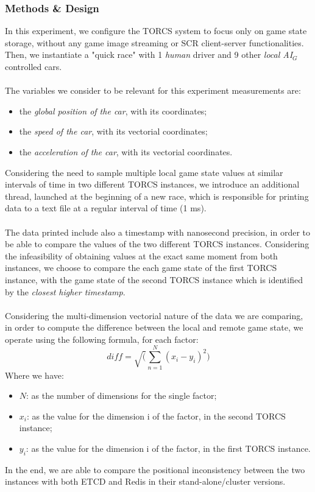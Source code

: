 \subsubsection{Methods \& Design}
In this experiment, we configure the TORCS system to focus only on game state storage, without any game image streaming or SCR client-server functionalities. Then, we instantiate a "quick race" with 1 \textit{human} driver and 9 other \textit{local AI$_G$} controlled cars. \\ \\
The variables we consider to be relevant for this experiment measurements are:
\begin{itemize}
	\item the \textit{global position of the car}, with its coordinates;
	\item the \textit{speed of the car}, with its vectorial coordinates;
	\item the \textit{acceleration of the car}, with its vectorial coordinates.
\end{itemize}
Considering the need to sample multiple local game state values at similar intervals of time in two different TORCS instances, we introduce an additional thread, launched at the beginning of a new race, which is responsible for printing data to a text file at a regular interval of time (1 ms). \\ \\
The data printed include also a timestamp with nanosecond precision, in order to be able to compare the values of the two different TORCS instances. Considering the infeasibility of obtaining values at the exact same moment from both instances, we choose to compare the each game state of the first TORCS instance, with the game state of the second TORCS instance which is identified by the \textit{closest higher timestamp}. \\ \\
Considering the multi-dimension vectorial nature of the data we are comparing, in order to compute the difference between the local and remote game state, we operate using the following formula, for each factor:
\[diff = \sqrt(\sum_{n=1}^N (x_i-y_i)^2)\]
Where we have:
\begin{itemize}
	\item $N$: as the number of dimensions for the single factor;
	\item $x_i$: as the value for the dimension {i} of the factor, in the second TORCS instance;
	\item $y_i$: as the value for the dimension {i} of the factor, in the first TORCS instance.
\end{itemize}
In the end, we are able to compare the positional inconsistency between the two instances with both ETCD and Redis in their stand-alone/cluster versions.